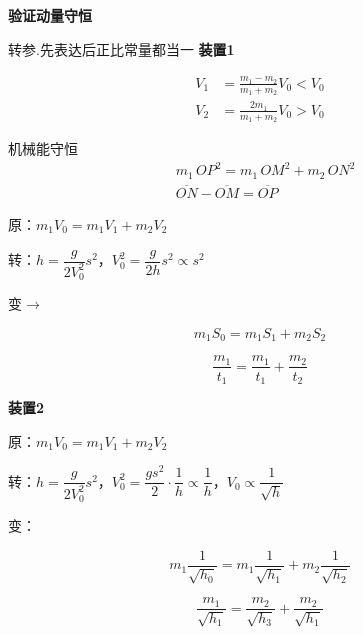 \textbf{验证动量守恒}

\hspace{2em}转参.先表达后正比常量都当一
\textbf{装置1}


\begin{align*}
V_1&=\frac{m_1-m_2}{m_1+m_2}V_0<V_0\\
V_2&=\frac{2m_1}{m_1+m_2}V_0>V_0
\end{align*}

机械能守恒
\begin{align*}
& m_1\,OP^2=m_1\,OM^2+m_2\,ON^2\\
& \overline{ON}-\overline{OM}=\overline{OP}
\end{align*}

原：$m_1V_0=m_1V_1+m_2V_2$

转：$h=\dfrac{g}{2V_0^2}s^2$，\quad $V_0^2=\dfrac{g}{2h}s^2\propto s^2$

变$\to$
\begin{keybox}
\[m_1S_0=m_1S_1+m_2S_2\]
\end{keybox}

\begin{keybox}
\[\frac{m_1}{t_1}=\frac{m_1}{t_1}+\frac{m_2}{t_2}\] %
\end{keybox}
\textbf{装置2}


原：$m_1V_0=m_1V_1+m_2V_2$

转：$h=\dfrac{g}{2V_0^2}s^2$，\quad $V_0^2=\dfrac{gs^2}{2}\cdot\dfrac{1}{h}\propto\dfrac{1}{h}$，\quad $V_0\propto\dfrac{1}{\sqrt{h}}$

变：
\begin{keybox}
\[m_1\frac{1}{\sqrt{h_0}}=m_1\frac{1}{\sqrt{h_1}}+m_2\frac{1}{\sqrt{h_2}}\]
\end{keybox}

\[\frac{m_1}{\sqrt{h_1}}=\frac{m_2}{\sqrt{h_3}}+\frac{m_2}{\sqrt{h_1}}\] %

